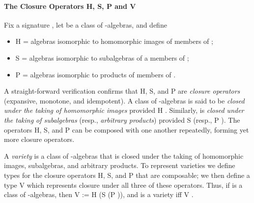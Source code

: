 \begin{code}
%
\>[1]\AgdaSpace{}%
\AgdaSymbol{(}%
\>[20]\AgdaSymbol{\{}\AgdaSpace{}%
\AgdaSymbol{=}\AgdaSpace{}%
\AgdaSymbol{\}\{}\AgdaSymbol{\}\{}\AgdaSymbol{\}}%
\>[35]\AgdaSpace{}%
%
\>[44]\AgdaSymbol{)}\AgdaSpace{}%
\AgdaSymbol{=}\AgdaSpace{}%
%
\>[56]\AgdaSpace{}%
\AgdaSymbol{\{}\AgdaSpace{}%
\AgdaSymbol{=}\AgdaSpace{}%
\AgdaSymbol{\}\{}\AgdaSymbol{\}\{}\AgdaSymbol{\}}%
\>[84]\AgdaSymbol{(}\AgdaSpace{}%
\AgdaSymbol{)(}\AgdaSpace{}%
\AgdaSymbol{)}\<%
\end{code}
\fi

\paragraph*{The Closure Operators H, S, P and V}
Fix a signature , let  be a class of -algebras, and define
\begin{itemize}
\item \af H  = algebras isomorphic to homomorphic images of members of ;
\item \af S  = algebras isomorphic to subalgebras of a members of ;
\item \af P  = algebras isomorphic to products of members of .
\end{itemize}
\ifshort\else
A straight-forward verification confirms that
\fi
\af H, \af S, and \af P are \emph{closure operators} (expansive, monotone, and
idempotent).  A class  of -algebras is said to be \emph{closed under
the taking of homomorphic images} provided \af H   . Similarly,  is
\emph{closed under the taking of subalgebras} (resp., \emph{arbitrary products}) provided
\af S    (resp., \af P   ). The operators \af H, \af
S, and \af P can be composed with one another repeatedly, forming yet more closure
operators.


A \emph{variety} is a class of -algebras that is closed under the taking of
homomorphic images, subalgebras, and arbitrary products.  To represent varieties
we define types for the closure operators \af H, \af S, and \af P that are composable; we
then define a type \af V which represents closure under all three of these operators.
Thus, if  is a class of -algebras, then
\af V  := \af H (\af S (\af P )), and  is a variety iff \af V   .
\ifshort\else

